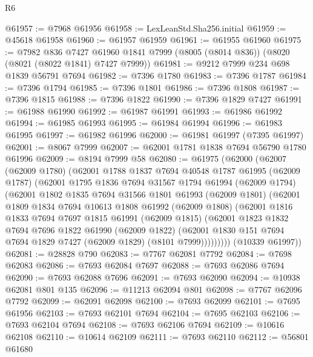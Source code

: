 \begin{lexlean}{R6}
\begin{coremodule}
@61957 := @7968 @61956
@61958 := LexLeanStd.Sha256.initial
@61959 := @45618 @61958
@61960 := @61957 @61959
@61961 := @61955 @61960
@61975 := @7982
    @836
    @7427
    @61960
    @1841
    @7999
    (@8005 (@8014 @836))
    (@8020 (@8021 (@8022 @1841) @7427 @7999))
@61981 := @9212 @7999 @234 @698 @1839 @56791 @7694
@61982 := @7396 @1780
@61983 := @7396 @1787
@61984 := @7396 @1794
@61985 := @7396 @1801
@61986 := @7396 @1808
@61987 := @7396 @1815
@61988 := @7396 @1822
@61990 := @7396 @1829 @7427
@61991 := @61988 @61990
@61992 := @61987 @61991
@61993 := @61986 @61992
@61994 := @61985 @61993
@61995 := @61984 @61994
@61996 := @61983 @61995
@61997 := @61982 @61996
@62000 := @61981 @61997 (@7395 @61997)
@62001 := @8067 @7999
@62007 := @62001 @1781 @1838 @7694 @56790 @1780 @61996
@62009 := @8194 @7999 @58
@62080 := @61975
    (@62000
      (@62007
        (@62009 @1780)
        (@62001
          @1788
          @1837
          @7694
          @40548
          @1787
          @61995
          (@62009 @1787)
          (@62001
            @1795
            @1836
            @7694
            @31567
            @1794
            @61994
            (@62009 @1794)
            (@62001
              @1802
              @1835
              @7694
              @31566
              @1801
              @61993
              (@62009 @1801)
              (@62001
                @1809
                @1834
                @7694
                @10613
                @1808
                @61992
                (@62009 @1808)
                (@62001
                  @1816
                  @1833
                  @7694
                  @7697
                  @1815
                  @61991
                  (@62009 @1815)
                  (@62001
                    @1823
                    @1832
                    @7694
                    @7696
                    @1822
                    @61990
                    (@62009 @1822)
                    (@62001 @1830 @151 @7694 @7694 @1829 @7427 (@62009 @1829) (@8101 @7999)))))))))
      (@10339 @61997))
@62081 := @28828 @790
@62083 := @7767 @62081 @7792
@62084 := @7698 @62083
@62086 := @7693 @62084 @7697
@62088 := @7693 @62086 @7694
@62090 := @7693 @62088 @7696
@62091 := @7693 @62090
@62094 := @10938 @62081 @801 @135
@62096 := @11213 @62094 @801
@62098 := @7767 @62096 @7792
@62099 := @62091 @62098
@62100 := @7693 @62099
@62101 := @7695 @61956
@62103 := @7693 @62101 @7694
@62104 := @7695 @62103
@62106 := @7693 @62104 @7694
@62108 := @7693 @62106 @7694
@62109 := @10616 @62108
@62110 := @10614 @62109
@62111 := @7693 @62110
@62112 := @56801 @61680

\end{coremodule}
\end{lexlean}
